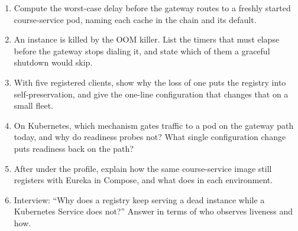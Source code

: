 \begin{quiz}
\begin{enumerate}
  \item Compute the worst-case delay before the gateway routes to a
  freshly started course-service pod, naming each cache in the chain
  and its default.
  \item An instance is killed by the OOM killer. List the timers that
  must elapse before the gateway stops dialing it, and state which of
  them a graceful shutdown would skip.
  \item With five registered clients, show why the loss of one puts the
  registry into self-preservation, and give the one-line configuration
  that changes that on a small fleet.
  \item On Kubernetes, which mechanism gates traffic to a pod on the
  gateway path today, and why do readiness probes not? What single
  configuration change puts readiness back on the path?
  \item After  under the 
  profile, explain how the same course-service image still registers
  with Eureka in Compose, and what 
  does in each environment.
  \item Interview: ``Why does a registry keep serving a dead instance
  while a Kubernetes Service does not?'' Answer in terms of who
  observes liveness and how.
\end{enumerate}
\end{quiz}
